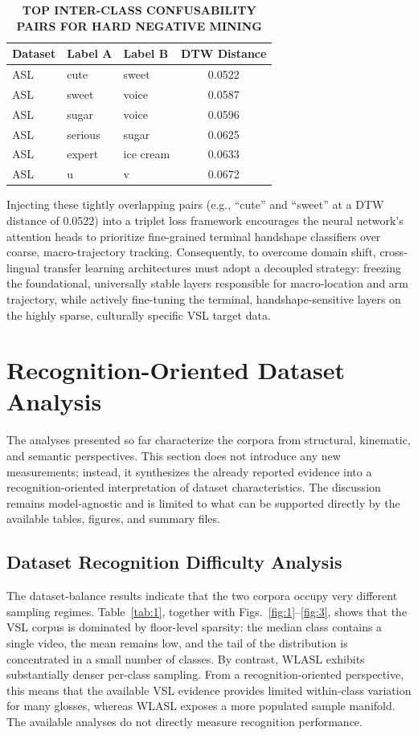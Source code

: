 \documentclass{ieeeaccess}
\begin{document}
\begin{table}[htbp]
\caption{\textbf{TOP INTER-CLASS CONFUSABILITY PAIRS FOR HARD NEGATIVE MINING}}
\label{tab:hard_negatives}
\centering
\setlength{\tabcolsep}{6pt}
\begin{tabular}{|l|l|l|c|}
\hline
\textbf{Dataset} & \textbf{Label A} & \textbf{Label B} & \textbf{DTW Distance} \\
\hline
ASL & cute & sweet & 0.0522 \\
ASL & sweet & voice & 0.0587 \\
ASL & sugar & voice & 0.0596 \\
ASL & serious & sugar & 0.0625 \\
ASL & expert & ice cream & 0.0633 \\
ASL & u & v & 0.0672 \\
\hline
\end{tabular}
\end{table}

Injecting these tightly overlapping pairs (e.g., ``cute'' and ``sweet'' at a DTW distance of 0.0522) into a triplet loss framework encourages the neural network's attention heads to prioritize fine-grained terminal handshape classifiers over coarse, macro-trajectory tracking. Consequently, to overcome domain shift, cross-lingual transfer learning architectures must adopt a decoupled strategy: freezing the foundational, universally stable layers responsible for macro-location and arm trajectory, while actively fine-tuning the terminal, handshape-sensitive layers on the highly sparse, culturally specific VSL target data.

\section{Recognition-Oriented Dataset Analysis}
\label{sec:recognition_oriented_dataset_analysis}

The analyses presented so far characterize the corpora from structural, kinematic, and semantic perspectives. This section does not introduce any new measurements; instead, it synthesizes the already reported evidence into a recognition-oriented interpretation of dataset characteristics. The discussion remains model-agnostic and is limited to what can be supported directly by the available tables, figures, and summary files.

\subsection{Dataset Recognition Difficulty Analysis}
The dataset-balance results indicate that the two corpora occupy very different sampling regimes. Table~\ref{tab:1}, together with Figs.~\ref{fig:1}--\ref{fig:3}, shows that the VSL corpus is dominated by floor-level sparsity: the median class contains a single video, the mean remains low, and the tail of the distribution is concentrated in a small number of classes. By contrast, WLASL exhibits substantially denser per-class sampling. From a recognition-oriented perspective, this means that the available VSL evidence provides limited within-class variation for many glosses, whereas WLASL exposes a more populated sample manifold. The available analyses do not directly measure recognition performance.
\end{document}
